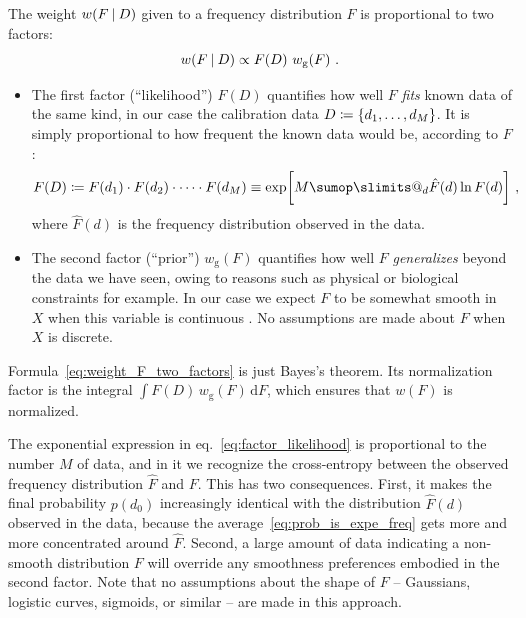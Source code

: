 \documentclass[\ifafour a4paper,12pt,\else a5paper,10pt,\fi%
onecolumn,oneside,article,%
british%
]{memoir}
\makeatletter
\theoremstyle{remark}
\theoremstyle{innote}
\def\sum{\DOTSI\sumop\slimits@}
\newcommand*{\wrench}{{\fontencoding{U}\fontfamily{fontawesomethree}\selectfont\symbol{114}}}
\newcommand{\mynotew}[1]{{\footnotesize\color{notecolour}\wrench\ #1}}
\newcommand*{\di}{\mathrm{d}}%
\newcommand*{\defd}{\coloneqq}
\DeclarePairedDelimiter\set{\{}{\}} %
\renewcommand*{\|}[1][]{\nonscript\:#1\vert\nonscript\:\mathopen{}}
\newcommand*{\eqn}{eq.}%
\newcommand*{\wf}{w}
\newcommand*{\wfo}{w_{\textrm{g}}}
\makeatother
\begin{document}
The weight $\wf(F \| D)$ given to a frequency distribution $F$ is proportional to two factors:
\begin{equation}
  \label{eq:weight_F_two_factors}
  \wf(F \| D) \propto F(D)\ \wfo(F) \ .
\end{equation}
\begin{itemize}
  \item The first factor (\enquote{likelihood}) $F(D)$ quantifies how well $F$ \emph{fits} known data of the same kind, in our case the calibration data $D \defd \set{d_{1}, \dotsc, d_{M}}$. It is simply proportional to how frequent the known data would be, according to $F$:
  \begin{equation}
    \label{eq:factor_likelihood}
    F(D) \defd F(d_{1})\cdot F(d_{2})\cdot \dotsm\cdot F(d_{M})
    \equiv \exp\biggl[M \sum_{d} \hat{F}(d) \ln F(d)\biggr] \ ,
  \end{equation}
where $\hat{F}(d)$ is the frequency distribution observed in the data.
  
\item The second factor (\enquote{prior}) $\wfo(F)$ quantifies how well $F$ \emph{generalizes} beyond the data we have seen, owing to reasons such as physical or biological constraints for example. In our case we expect $F$ to be somewhat smooth in $X$ when this variable is continuous \autocites[Cf.][]{goodetal1971}. No assumptions are made about $F$ when $X$ is discrete.
\end{itemize}
Formula~\eqref{eq:weight_F_two_factors} is just Bayes's theorem. Its normalization factor is the integral $\int F(D)\, \wfo(F)\, \di F$, which ensures that $\wf(F)$ is normalized.

The exponential expression in \eqn~\eqref{eq:factor_likelihood} is proportional to the number $M$ of data, and in it we recognize the cross-entropy between the observed frequency distribution $\hat{F}$ and $F$. This has two consequences. First, it makes the final probability $p(d_{0})$ increasingly identical with the distribution $\hat{F}(d)$ observed in the data, because the average~\eqref{eq:prob_is_expe_freq} gets more and more concentrated around $\hat{F}$. Second, a large amount of data indicating a non-smooth distribution $F$ will override any smoothness preferences embodied in the second factor. Note that no assumptions about the shape of $F$ -- Gaussians, logistic curves, sigmoids, or similar -- are made in this approach.
\end{document}
